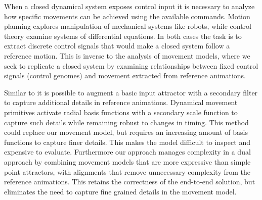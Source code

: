 When a closed dynamical system exposes control input it is necessary to analyze how specific movements can be achieved using the available commands. Motion planning explores manipulation of mechanical systems like robots, while control theory examine systems of differential equations. In both cases the task is to extract discrete control signals that would make a closed system follow a reference motion. This is inverse to the analysis of movement models, where we seek to replicate a closed system by examining relationships between fixed control signals (control genomes) and movement extracted from reference animations. 

Similar to \citep{startke20} it is possible to augment a basic input attractor with a secondary filter to capture additional details in reference animations. Dynamical movement primitives activate radial basis functions with a secondary scale function to capture such details while remaining robust to changes in timing. This method could replace our movement model, but requires an increasing amount of basis functions to capture finer details. This makes the model difficult to inspect and expensive to evaluate. Furthermore our approach manages complexity in a dual approach by combining movement models that are more expressive than simple point attractors, with alignments that remove unnecessary complexity from the reference animations. This retains the correctness of the end-to-end solution, but eliminates the need to capture fine grained details in the movement model.




